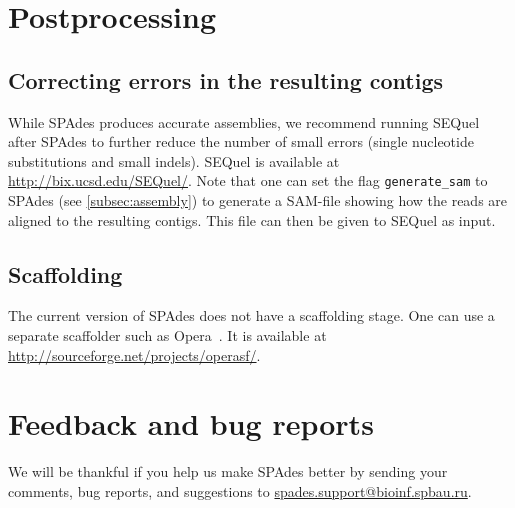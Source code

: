 \documentclass{article}
\def\spades{SPAdes}
\begin{document}
\section{Postprocessing}

\subsection{Correcting errors in the resulting contigs}
While {\spades} produces accurate assemblies, 
we recommend running SEQuel~\cite{sequel} after {\spades} to further reduce the number of small errors
(single nucleotide substitutions and small indels). SEQuel is available at
\url{http://bix.ucsd.edu/SEQuel/}. Note that one can set the flag {\tt generate\_sam} to {\spades}
(see \cref{subsec:assembly}) to generate a SAM-file showing how the 
reads are aligned to the resulting contigs. This file can then be given to SEQuel as input.

\subsection{Scaffolding}
The current version of {\spades} does not have a scaffolding stage.
One can use a separate scaffolder such as Opera~\cite{opera}.
It is available at \url{http://sourceforge.net/projects/operasf/}.

\section{Feedback and bug reports}
We will be thankful if you help us make {\spades} better
by sending your comments, bug reports, and suggestions to
\url{spades.support@bioinf.spbau.ru}.




\end{document}
